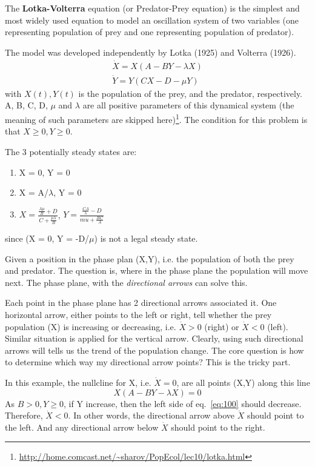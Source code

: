 The {\bf Lotka-Volterra} equation (or Predator-Prey equation)
is the simplest and most widely used equation to model an oscillation system of
two variables (one representing population of prey and one representing
population of predator).

The model was developed independently by Lotka (1925) and Volterra (1926).
\begin{equation}
  \label{eq:82}
  \begin{split}
      \dot{X} = X(A-BY-\lambda X) \\
      \dot{Y} = Y(CX-D- \mu Y)
  \end{split}
\end{equation}
with $X(t), Y(t)$ is the population of the prey, and the predator,
respectively. A, B, C, D, $\mu$ and $\lambda$ are all positive
parameters of this dynamical system (the meaning of such parameters
are skipped here)\footnote{\url{http://home.comcast.net/~sharov/PopEcol/lec10/lotka.html}}. 
The condition for this problem is that $X\ge 0, Y\ge 0$.

The 3 potentially steady states are:
\begin{enumerate}
\item X = 0, Y = 0

\item X = A/$\lambda$, Y = 0

\item $X=\frac{\frac{A\mu}{B}+D}{C+\frac{\mu\lambda}{B}}$, 
$Y = \frac{\frac{CA}{\lambda} - D}{mu + \frac{BC}{A}}$
\end{enumerate}
since (X = 0, Y = -D/$\mu$) is not a legal steady state.

Given a position in the phase plan (X,Y), i.e. the population of both
the prey and predator. The question is, where in the phase plane the
population will move next. The phase plane, with the {\it directional
  arrows} can solve this.

Each point in the phase plane has 2 directional arrows associated
it. One horizontal arrow, either points to the left or right, tell
whether the prey population (X) is increasing or decreasing,
i.e. $\dot{X} > 0$ (right) or $\dot{X} < 0$ (left). Similar situation
is applied for the vertical arrow. Clearly, using such directional
arrows will tells us the trend of the population change. The core
question is how to determine which way my directional arrow points?
This is the tricky part.

In this example, the nullcline for X, i.e. $\dot{X}=0$, are all points
(X,Y) along this line
\begin{equation}
  \label{eq:100}
  X(A-BY-\lambda X) = 0
\end{equation}
As $B>0, Y\ge 0$, if Y increase, then the left side of
eq.~\eqref{eq:100} should decrease. Therefore, $\dot{X}<0$. In other
words, the directional arrow above $\dot{X}$ should point to the
left. And any directional arrow below $\dot{X}$ should point to the
right. 

